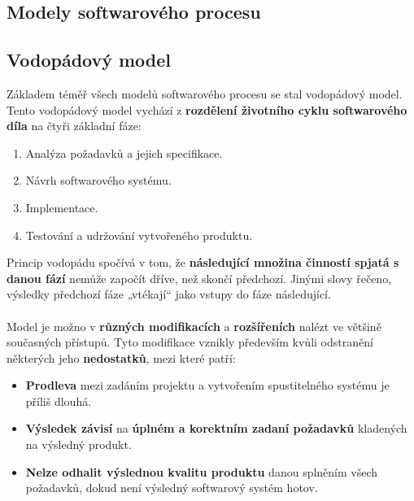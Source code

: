\subsection*{Modely softwarového procesu}
\subsection{Vodopádový model}
Základem téměř všech modelů softwarového procesu se stal vodopádový model. Tento vodopádový model vychází z \textbf{rozdělení životního cyklu softwarového díla} na čtyři základní fáze:
\begin{enumerate}
\item Analýza požadavků a jejich specifikace.
\item Návrh softwarového systému.
\item Implementace.
\item Testování a udržování vytvořeného produktu.
\end{enumerate}
Princip vodopádu spočívá v tom, že \textbf{následující množina činností spjatá s danou fází} nemůže započít dříve, než skončí předchozí. Jinými slovy řečeno, výsledky předchozí fáze „vtékají“ jako vstupy do fáze následující.
\\\\
\noindent{}
Model je možno v \textbf{různých modifikacích} a \textbf{rozšířeních} nalézt ve většině současných přístupů. Tyto modifikace vznikly především kvůli odstranění některých jeho \textbf{nedostatků}, mezi které patří:
\begin{itemize}
\item \textbf{Prodleva} mezi zadáním projektu a vytvořením spustitelného systému je příliš dlouhá.
\item \textbf{Výsledek závisí} na \textbf{úplném a korektním zadaní požadavků} kladených na výsledný produkt.
\item \textbf{Nelze odhalit výslednou kvalitu produktu} danou splněním všech požadavků, dokud není výsledný softwarový systém hotov.
\end{itemize}

